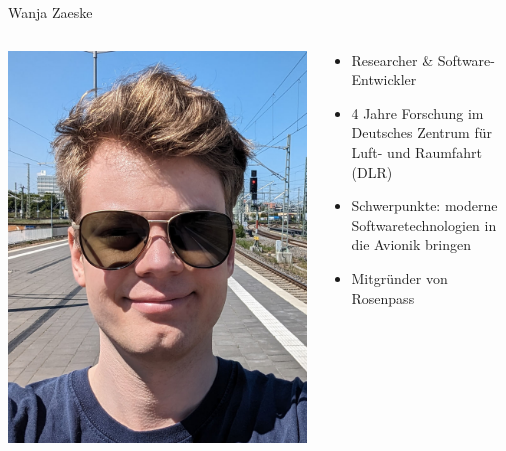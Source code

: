 \begin{frame}{Wanja Zaeske}
  \begin{columns}[fullwidth,c]
    \begin{column}{.3\linewidth}
      \includegraphics[width=.92\linewidth]{graphics/wanja-zaeske.png}
    \end{column}
    \begin{column}{.7\linewidth}
      \begin{itemize}
        \item Researcher \& Software-Entwickler
        \item 4 Jahre Forschung im Deutsches Zentrum für Luft- und Raumfahrt (DLR)
        \item Schwerpunkte: moderne Softwaretechnologien in die Avionik bringen
        \item Mitgründer von Rosenpass
      \end{itemize}
    \end{column}%
  \end{columns}
\end{frame}

